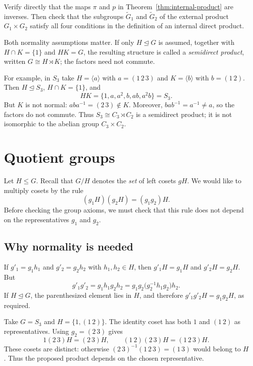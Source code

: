 \documentclass[reqno,11pt]{amsart}
\begin{document}
\begin{exercise}
Verify directly that the maps $\pi$ and $p$ in
Theorem~\ref{thm:internal-product} are inverses. Then check that the
subgroups $\widetilde G_1$ and $\widetilde G_2$ of the external product
$G_1\times G_2$ satisfy all four conditions in the definition of an
internal direct product.
\end{exercise}

\begin{remark}
Both normality assumptions matter. If only $H\trianglelefteq G$ is
assumed, together with $H\cap K=\{1\}$ and $HK=G$, the resulting
structure is called a \emph{semidirect product}, written
$G\cong H\rtimes K$; the factors need not commute.

For example, in $S_3$ take $H=\langle a\rangle$ with $a=(1\,2\,3)$
and $K=\langle b\rangle$ with $b=(1\,2)$. Then $H\trianglelefteq S_3$,
$H\cap K=\{1\}$, and
\[
  HK=\{1,a,a^2,b,ab,a^2b\}=S_3.
\]
But $K$ is not normal: $aba^{-1}=(2\,3)\notin K$.
Moreover, $bab^{-1}=a^{-1}\ne a$, so the factors do not commute.
Thus $S_3\cong C_3\rtimes C_2$ is a semidirect product; it is not
isomorphic to the abelian group $C_3\times C_2$.
\end{remark}


\section{Quotient groups}

Let $H\leq G$. Recall that $G/H$ denotes the \emph{set} of left
cosets $gH$. We would like to multiply cosets by the rule
\[
  (g_1H)(g_2H)=(g_1g_2)H.
\]
Before checking the group axioms, we must check that this rule does not
depend on the representatives $g_1$ and $g_2$.

\subsection{Why normality is needed}

If $g'_1=g_1h_1$ and $g'_2=g_2h_2$ with $h_1,h_2\in H$, then
$g'_1H=g_1H$ and $g'_2H=g_2H$. But
\[
  g'_1g'_2=g_1h_1g_2h_2
  =g_1g_2\bigl(g_2^{-1}h_1g_2\bigr)h_2.
\]
If $H\trianglelefteq G$, the parenthesized element lies in $H$, and
therefore $g'_1g'_2H=g_1g_2H$, as required.

\begin{example}
Take $G=S_3$ and $H=\{1,(1\,2)\}$. The identity coset has both
$1$ and $(1\,2)$ as representatives. Using $g_2=(2\,3)$ gives
\[
  1(2\,3)H=(2\,3)H,\qquad
  (1\,2)(2\,3)H=(1\,2\,3)H.
\]
These cosets are distinct: otherwise
$(2\,3)^{-1}(1\,2\,3)=(1\,3)$ would belong to $H$.
Thus the proposed product depends on the chosen representative.
\end{example}
\end{document}
